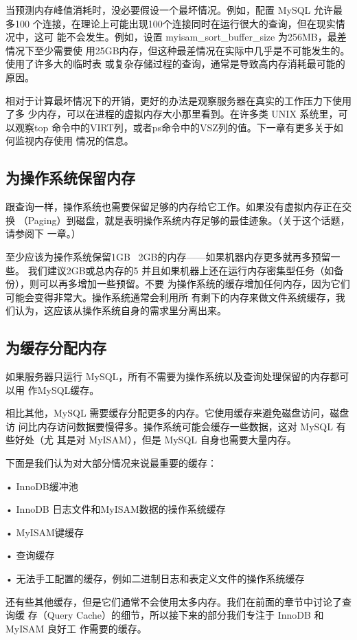 当预测内存峰值消耗时，没必要假设一个最坏情况。例如，配置 MySQL 允许最多100
个连接，在理论上可能出现100个连接同时在运行很大的查询，但在现实情况中，这可
能不会发生。例如，设置 myisam\_sort\_buffer\_size 为256MB，最差情况下至少需要使
用25GB内存，但这种最差情况在实际中几乎是不可能发生的。使用了许多大的临时表
或复杂存储过程的查询，通常是导致高内存消耗最可能的原因。

相对于计算最坏情况下的开销，更好的办法是观察服务器在真实的工作压力下使用了多
少内存，可以在进程的虚拟内存大小那里看到。在许多类 UNIX 系统里，可以观察top
命令中的VIRT列，或者ps命令中的VSZ列的值。下一章有更多关于如何监视内存使用
情况的信息。

\subsection{为操作系统保留内存}
跟查询一样，操作系统也需要保留足够的内存给它工作。如果没有虚拟内存正在交换
（Paging）到磁盘，就是表明操作系统内存足够的最佳迹象。（关于这个话题，请参阅下
一章。）

至少应该为操作系统保留1GB ~2GB的内存——如果机器内存更多就再多预留一些。
我们建议2GB或总内存的5%
并且如果机器上还在运行内存密集型任务（如备份），则可以再多增加一些预留。不要
为操作系统的缓存增加任何内存，因为它们可能会变得非常大。操作系统通常会利用所
有剩下的内存来做文件系统缓存，我们认为，这应该从操作系统自身的需求里分离出来。
\subsection{为缓存分配内存}
如果服务器只运行 MySQL，所有不需要为操作系统以及查询处理保留的内存都可以用
作MySQL缓存。

相比其他，MySQL 需要缓存分配更多的内存。它使用缓存来避免磁盘访问，磁盘访
问比内存访问数据要慢得多。操作系统可能会缓存一些数据，这对 MySQL 有些好处（尤
其是对 MyISAM），但是 MySQL 自身也需要大量内存。

下面是我们认为对大部分情况来说最重要的缓存：

• InnoDB缓冲池

• InnoDB 日志文件和MyISAM数据的操作系统缓存

• MyISAM键缓存

• 查询缓存

• 无法手工配置的缓存，例如二进制日志和表定义文件的操作系统缓存

还有些其他缓存，但是它们通常不会使用太多内存。我们在前面的章节中讨论了查询缓
存（Query Cache）的细节，所以接下来的部分我们专注于 InnoDB 和MyISAM 良好工
作需要的缓存。

